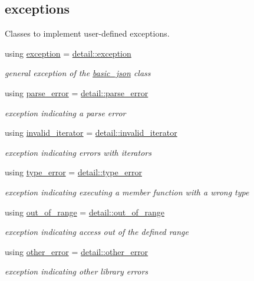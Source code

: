 \subsection*{exceptions}
\label{_amgrp19ad27801b95bd1f2c6c2bf83dbb7515}%
Classes to implement user-\/defined exceptions. \begin{DoxyCompactItemize}
\item 
using \hyperlink{classnlohmann_1_1basic__json_a9a0aced019cb1d65bb49703406c84970}{exception} = \hyperlink{classnlohmann_1_1detail_1_1exception}{detail\+::exception}
\begin{DoxyCompactList}\small\item\em general exception of the \hyperlink{classnlohmann_1_1basic__json}{basic\+\_\+json} class \end{DoxyCompactList}\item 
using \hyperlink{classnlohmann_1_1basic__json_af1efc2468e6022be6e35fc2944cabe4d}{parse\+\_\+error} = \hyperlink{classnlohmann_1_1detail_1_1parse__error}{detail\+::parse\+\_\+error}
\begin{DoxyCompactList}\small\item\em exception indicating a parse error \end{DoxyCompactList}\item 
using \hyperlink{classnlohmann_1_1basic__json_ac13d32f7cbd02d616e71d8dc30dadcbf}{invalid\+\_\+iterator} = \hyperlink{classnlohmann_1_1detail_1_1invalid__iterator}{detail\+::invalid\+\_\+iterator}
\begin{DoxyCompactList}\small\item\em exception indicating errors with iterators \end{DoxyCompactList}\item 
using \hyperlink{classnlohmann_1_1basic__json_a4010e8e268fefd86da773c10318f2902}{type\+\_\+error} = \hyperlink{classnlohmann_1_1detail_1_1type__error}{detail\+::type\+\_\+error}
\begin{DoxyCompactList}\small\item\em exception indicating executing a member function with a wrong type \end{DoxyCompactList}\item 
using \hyperlink{classnlohmann_1_1basic__json_a28f7c2f087274a0012eb7a2333ee1580}{out\+\_\+of\+\_\+range} = \hyperlink{classnlohmann_1_1detail_1_1out__of__range}{detail\+::out\+\_\+of\+\_\+range}
\begin{DoxyCompactList}\small\item\em exception indicating access out of the defined range \end{DoxyCompactList}\item 
using \hyperlink{classnlohmann_1_1basic__json_a3333a5a8714912adda33a35b369f7b3d}{other\+\_\+error} = \hyperlink{classnlohmann_1_1detail_1_1other__error}{detail\+::other\+\_\+error}
\begin{DoxyCompactList}\small\item\em exception indicating other library errors \end{DoxyCompactList}\end{DoxyCompactItemize}
